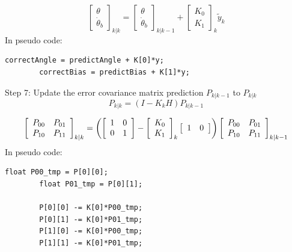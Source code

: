 \documentclass[a4paper]{report}
\begin{document}
		\begin{equation}
		\left[
		\begin{array}{c}
		\theta\\
		\dot{\theta}_{b}
		\end{array} \right]_{k|k}
		=
		\left[
		\begin{array}{c}
		\theta\\
		\dot{\theta}_{b}
		\end{array} \right]_{k|k-1}
		+
		\left[
		\begin{array}{c}
		K_{0}\\
		K_{1}
		\end{array} \right]_{k}
		\tilde{y}_{k}
		\end{equation}
    In pseudo code:
		\begin{lstlisting}[frame=single]
		correctAngle = predictAngle + K[0]*y;
		correctBias = predictBias + K[1]*y;
		\end{lstlisting}
		Step 7: Update the error covariance matrix prediction $P_{k|k-1}$ to $P_{k|k}$
		\begin{equation}
		P_{k|k}=(I-K_{k}H)P_{k|k-1}
		\end{equation}

		\begin{equation}
		\left[
		\begin{array}{c c}
		P_{00}	&	P_{01}\\
		P_{10}	&	P_{11}
		\end{array} \right]_{k|k}
		=
		\left(
		\left[
		\begin{array}{c c}
		1	&	0\\
		0	&	1
		\end{array} \right]
		-
		\left[
		\begin{array}{c}
		K_{0}\\
		K_{1}
		\end{array} \right]_{k}
		\left[
		\begin{array}{c c}
		1	&	0
		\end{array} \right]
		\right)
		\left[
		\begin{array}{c c}
		P_{00}	&	P_{01}\\
		P_{10}	&	P_{11}
		\end{array} \right]_{k|k-1}
		\end{equation}
    In pseudo code:
		\begin{lstlisting}[frame=single]
		float P00_tmp = P[0][0];
		float P01_tmp = P[0][1];

		P[0][0] -= K[0]*P00_tmp;
		P[0][1] -= K[0]*P01_tmp;
		P[1][0] -= K[0]*P00_tmp;
		P[1][1] -= K[0]*P01_tmp;
		\end{lstlisting}
\end{document}
